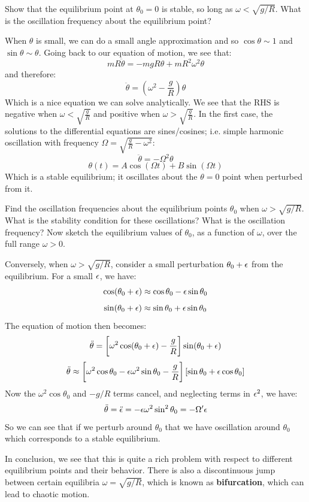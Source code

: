 \documentclass[../PHYS306Notes.tex]{subfiles}
\begin{document}
\begin{p}
Show that the equilibrium point at $\theta_0 = 0$ is stable, so long as $\omega < \sqrt{g/R}$. What is the oscillation frequency about the equilibrium point?
\end{p}
\begin{s}
When $\theta$ is small, we can do a small angle approximation and so $\cos\theta \sim 1$ and $\sin\theta \sim \theta$. Going back to our equation of motion, we see that:
\[mR\ddot{\theta} = -mgR\theta + mR^2\omega^2\theta\]
and therefore:
\[\ddot{\theta} = \left(\omega^2 - \frac{g}{R}\right)\theta\]
Which is a nice equation we can solve analytically. We see that the RHS is negative when $\omega < \sqrt{\frac{g}{R}}$ and positive when $\omega > \sqrt{\frac{g}{R}}$. In the first case, the solutions to the differential equations are sines/cosines; i.e. simple harmonic oscillation with frequency $\Omega = \sqrt{\frac{g}{R} - \omega^2}$:
\[\ddot{\theta} = -\Omega^2\theta\]
\[\theta(t) = A\cos(\Omega t) + B\sin(\Omega t)\]
Which is a stable equilibrium; it oscillates about the $\theta = 0$ point when perturbed from it.
\end{s}

\begin{p}
Find the oscillation frequencies about the equilibrium points $\theta_0$ when $\omega > \sqrt{g/R}$. What is the stability condition for these oscillations? What is the oscillation frequency? Now sketch the equilibrium values of $\theta_0$, as a function of $\omega$, over the full range $\omega > 0$.
\end{p}
\begin{s}
Conversely, when $\omega > \sqrt{g/R}$, consider a small perturbation $\theta_0 + \epsilon$ from the equilibrium. For a small $\epsilon$, we have:
\[\cos(\theta_0 + \epsilon) \approx \cos\theta_0 - \epsilon\sin\theta_0\]
\[\sin(\theta_0 +\epsilon) \approx \sin\theta_0 +\epsilon\sin\theta_0\]
The equation of motion then becomes:
\[\ddot{\theta} = \left[\omega^2\cos(\theta_0 + \epsilon) - \frac{g}{R}\right]\sin(\theta_0 + \epsilon)\]
\[\ddot{\theta} \approx \left[\omega^2\cos\theta_0 - \epsilon\omega^2\sin\theta_0 - \frac{g}{R}\right]\left[\sin\theta_0 + \epsilon\cos\theta_0\right]\]
Now the $\omega^2\cos\theta_0$ and $-g/R$ terms cancel, and neglecting terms in $\epsilon^2$, we have:
\[\ddot{\theta} = \ddot{\epsilon} = -\epsilon\omega^2\sin^2\theta_0 = -\Omega'\epsilon\]
So we can see that if we perturb around $\theta_0$ that we have oscillation around $\theta_0$ which corresponds to a stable equilibrium. 
\end{s}
In conclusion, we see that this is quite a rich problem with respect to different equilibrium points and their behavior. There is also a discontinuous jump between certain equilibria $\omega = \sqrt{g/R}$, which is known as \textbf{bifurcation}, which can lead to chaotic motion.
\end{document}
